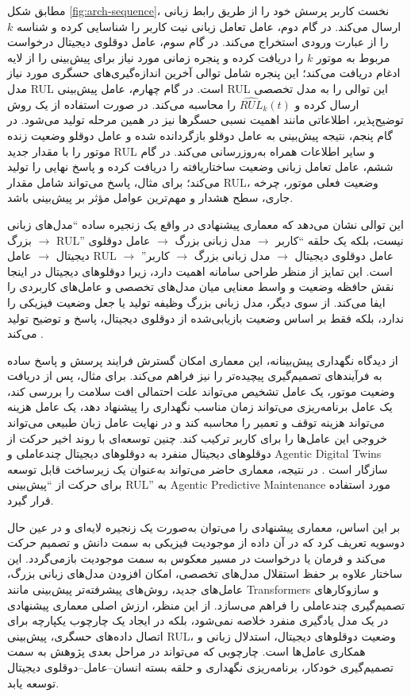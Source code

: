 \documentclass[a4paper,fleqn]{report}
\begin{document}
مطابق شکل \ref{fig:arch-sequence}، نخست کاربر پرسش خود را از طریق رابط زبانی ارسال می‌کند. در گام دوم، عامل تعامل زبانی نیت کاربر را شناسایی کرده و شناسه $k$ را از عبارت ورودی استخراج می‌کند. در گام سوم، عامل دوقلوی دیجیتال درخواست مربوط به موتور $k$ را دریافت کرده و پنجره زمانی مورد نیاز برای پیش‌بینی را از لایه ادغام دریافت می‌کند؛ این پنجره شامل توالی آخرین اندازه‌گیری‌های حسگری مورد نیاز مدل \gls{RUL} است. در گام چهارم، عامل پیش‌بینی \gls{RUL} این توالی را به مدل تخصصی ارسال کرده و $\widehat{RUL}_k(t)$ را محاسبه می‌کند. در صورت استفاده از یک روش توضیح‌پذیر، اطلاعاتی مانند اهمیت نسبی حسگرها نیز در همین مرحله تولید می‌شود. در گام پنجم، نتیجه پیش‌بینی به عامل دوقلو بازگردانده شده و عامل دوقلو وضعیت زنده موتور را با مقدار جدید \gls{RUL} و سایر اطلاعات همراه به‌روزرسانی می‌کند. در گام ششم، عامل تعامل زبانی وضعیت ساختاریافته را دریافت کرده و پاسخ نهایی را تولید می‌کند؛ برای مثال، پاسخ می‌تواند شامل مقدار \gls{RUL}، وضعیت فعلی موتور، چرخه جاری، سطح هشدار و مهم‌ترین عوامل مؤثر بر پیش‌بینی باشد.

این توالی نشان می‌دهد که معماری پیشنهادی در واقع یک زنجیره ساده ``مدل‌های زبانی بزرگ $\rightarrow$ \gls{RUL}'' نیست، بلکه یک حلقه ``کاربر $\rightarrow$ مدل زبانی بزرگ $\rightarrow$ عامل دوقلوی دیجیتال $\rightarrow$ عامل \gls{RUL} $\rightarrow$ عامل دوقلوی دیجیتال $\rightarrow$ مدل زبانی بزرگ $\rightarrow$ کاربر'' است. این تمایز از منظر طراحی سامانه اهمیت دارد، زیرا دوقلو‌های دیجیتال در اینجا نقش حافظه وضعیت و واسط معنایی میان مدل‌های تخصصی و عامل‌های کاربردی را ایفا می‌کند. از سوی دیگر، مدل‌ زبانی بزرگ وظیفه تولید یا جعل وضعیت فیزیکی را ندارد، بلکه فقط بر اساس وضعیت بازیابی‌شده از دوقلوی دیجیتال، پاسخ و توضیح تولید می‌کند \cite{zhou2026dtai,fu2026genaidt}.

از دیدگاه نگهداری پیش‌بینانه، این معماری امکان گسترش فرایند پرسش و پاسخ ساده به فرآیندهای تصمیم‌گیری پیچیده‌تر را نیز فراهم می‌کند. برای مثال، پس از دریافت وضعیت موتور، یک عامل تشخیص می‌تواند علت احتمالی افت سلامت را بررسی کند، یک عامل برنامه‌ریزی می‌تواند زمان مناسب نگهداری را پیشنهاد دهد، یک عامل هزینه می‌تواند هزینه توقف و تعمیر را محاسبه کند و در نهایت عامل زبان طبیعی می‌تواند خروجی این عامل‌ها را برای کاربر ترکیب کند. چنین توسعه‌ای با روند اخیر حرکت از دوقلو‌های دیجیتال منفرد به دوقلو‌های دیجیتال چندعاملی و \glspl{Agentic Digital Twin}  سازگار است \cite{coulibaly2026madtdt}. در نتیجه، معماری حاضر می‌تواند به‌عنوان یک زیرساخت قابل توسعه برای حرکت از ``پیش‌بینی \gls{RUL}'' به \gls{Agentic Predictive Maintenance} مورد استفاده قرار گیرد.

بر این اساس، معماری پیشنهادی را می‌توان به‌صورت یک زنجیره لایه‌ای و در عین حال دوسویه تعریف کرد که در آن داده از موجودیت فیزیکی به سمت دانش و تصمیم حرکت می‌کند و فرمان یا درخواست در مسیر معکوس به سمت موجودیت بازمی‌گردد. این ساختار علاوه بر حفظ استقلال مدل‌های تخصصی، امکان افزودن مدل‌های زبانی بزرگ، عامل‌های جدید، روش‌های پیشرفته‌تر پیش‌بینی مانند \glspl{Transformer} و سازوکارهای تصمیم‌گیری چندعاملی را فراهم می‌سازد. از این منظر، ارزش اصلی معماری پیشنهادی در یک مدل یادگیری منفرد خلاصه نمی‌شود، بلکه در ایجاد یک چارچوب یکپارچه برای اتصال داده‌های حسگری، پیش‌بینی \gls{RUL}، وضعیت دوقلو‌های دیجیتال، استدلال زبانی و همکاری عامل‌ها است. چارچوبی که می‌تواند در مراحل بعدی پژوهش به سمت تصمیم‌گیری خودکار، برنامه‌ریزی نگهداری و حلقه بسته انسان--عامل--دوقلوی‌ دیجیتال توسعه یابد.
\end{document}
